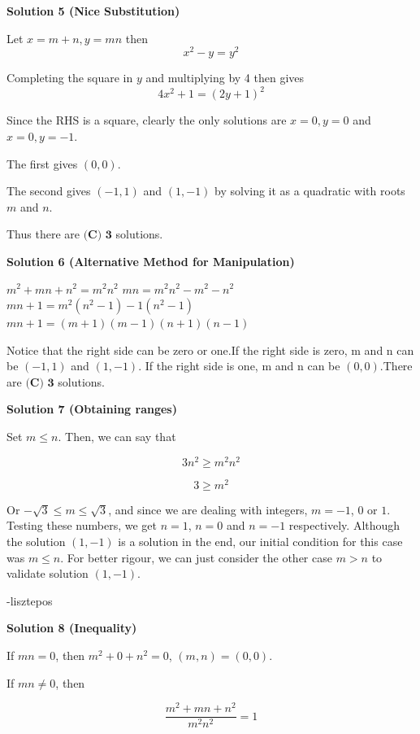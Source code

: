 \begin{enumerate}
 



\textbf{Solution 5 (Nice Substitution)}

Let $x=m+n, y=mn$ then 
 \[x^2-y=y^2\]

 Completing the square in $y$ and multiplying by 4 then gives
 \[4x^2+1=(2y+1)^2\] 

 Since the RHS is a square, clearly the only solutions are $x=0,y=0$ and $x=0,y=-1$.

 The first gives $(0,0)$.

 The second gives $(-1,1)$ and $(1,-1)$ by solving it as a quadratic with roots $m$ and $n$. 

 Thus there are $\boxed{\textbf{(C) 3}}$ solutions.

 



\textbf{Solution 6 (Alternative Method for Manipulation)}

$m^2 + mn + n^2 = m^2n^2$
$mn = m^2n^2 - m^2 - n^2$
$mn + 1 = m^2(n^2 - 1) - 1(n^2 - 1)$
$mn + 1 = (m + 1)(m - 1)(n + 1)(n - 1)$

 Notice that the right side can be zero or one.If the right side is zero, m and n can be $(-1,1)$ and $(1,-1)$. If the right side is one, m and n can be $(0,0)$.There are $\boxed{\textbf{(C) 3}}$ solutions.

 



\textbf{Solution 7 (Obtaining ranges)}

Set $m\leq n$. Then, we can say that 

 
 \[3n^2\geq m^2n^2\]

 \[3\geq m^2\]

 Or $-\sqrt{3} \leq m \leq \sqrt{3}$, and since we are dealing with integers, $m=-1$, $0$ or $1$. Testing these numbers, we get $n=1$, $n=0$ and $n=-1$ respectively. Although the solution $(1,-1)$ is a solution in the end, our initial condition for this case was $m\leq n$. For better rigour, we can just consider the other case $m>n$ to validate solution $(1,-1)$.

 -lisztepos

 



\textbf{Solution 8 (Inequality)}

If $mn = 0$, then $m^2 + 0 + n^2 = 0$, $(m, n) = (0, 0)$.

 If $mn \neq 0$, then

 
 \[\frac{m^2 + mn + n^2}{m^2n^2} = 1\]


\end{enumerate}
